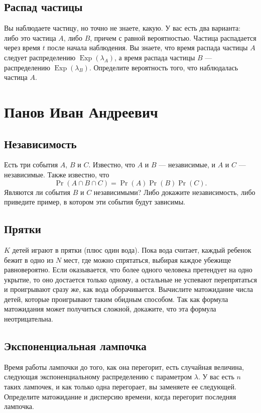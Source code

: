 \documentclass[12pt]{article}
\DeclareMathOperator{\Exp}{Exp}
\begin{document}
\subsection{Распад частицы}
Вы наблюдаете частицу, но точно не знаете, какую. У вас есть два варианта: либо это частица $A$, либо $B$, причем с равной вероятностью. Частица распадается через время $t$ после начала наблюдения. Вы знаете, что время распада частицы $A$ следует распределению $\Exp(\lambda_A)$, а время распада частицы $B$ --- распределению $\Exp(\lambda_B)$. Определите вероятность того, что наблюдалась частица $A$.

\newpage
\section{Панов Иван Андреевич}

\subsection{Независимость}
Есть три события $A$, $B$ и $C$. Известно, что $A$ и $B$ --- независимые, и $A$ и $C$ --- независимые. Также известно, что \[\Pr(A \cap B \cap C) = \Pr(A)\Pr(B)\Pr(C).\] Являются ли события $B$ и $C$ независимыми? Либо докажите независимость, либо приведите пример, в котором эти события будут зависимы.

\subsection{Прятки}
$K$ детей играют в прятки (плюс один вода). Пока вода считает, каждый ребенок бежит в одно из $N$ мест, где можно спрятаться, выбирая каждое убежище равновероятно. Если оказывается, что более одного человека претендует на одно укрытие, то оно достается только одному, а остальные не успевают перепрятаться и проигрывают сразу же, как вода оборачивается. Вычислите матожидание числа детей, которые проигрывают таким обидным способом. Так как формула матожидания может получиться сложной, докажите, что эта формула неотрицательна.

\subsection{Экспоненциальная лампочка}
Время работы лампочки до того, как она перегорит, есть случайная величина, следующая экспоненциальному распределению с параметром $\lambda$. У вас есть $n$ таких лампочек, и как только одна перегорает, вы заменяете ее следующей. Определите матожидание и дисперсию времени, когда перегорит последняя лампочка.
\end{document}
